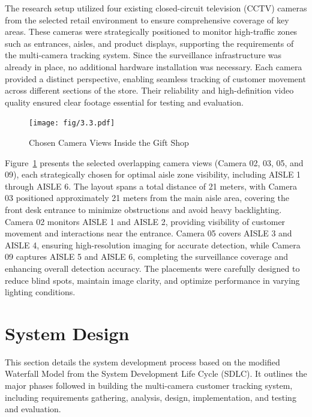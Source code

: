 {The research setup utilized four existing closed-circuit television (CCTV) cameras from the selected retail environment to ensure comprehensive coverage of key areas. These cameras were strategically positioned to monitor high-traffic zones such as entrances, aisles, and product displays, supporting the requirements of the multi-camera tracking system. Since the surveillance infrastructure was already in place, no additional hardware installation was necessary. Each camera provided a distinct perspective, enabling seamless tracking of customer movement across different sections of the store. Their reliability and high-definition video quality ensured clear footage essential for testing and evaluation.

\begin{figure}[H]
	\caption[Chosen Camera Views Inside the Gift Shop]{\newline \newline Chosen Camera Views Inside the Gift Shop}
	\centering
	\texttt{[image: fig/3.3.pdf]}
	\label{fig:3.3}
\end{figure}

Figure~\ref{fig:3.3} presents the selected overlapping camera views (Camera 02, 03, 05, and 09), each strategically chosen for optimal aisle zone visibility, including AISLE 1 through AISLE 6. The layout spans a total distance of 21 meters, with Camera 03 positioned approximately 21 meters from the main aisle area, covering the front desk entrance to minimize obstructions and avoid heavy backlighting. Camera 02 monitors AISLE 1 and AISLE 2, providing visibility of customer movement and interactions near the entrance. Camera 05 covers AISLE 3 and AISLE 4, ensuring high-resolution imaging for accurate detection, while Camera 09 captures AISLE 5 and AISLE 6, completing the surveillance coverage and enhancing overall detection accuracy. The placements were carefully designed to reduce blind spots, maintain image clarity, and optimize performance in varying lighting conditions.

\section{System Design}

This section details the system development process based on the modified Waterfall Model from the System Development Life Cycle (SDLC). It outlines the major phases followed in building the multi-camera customer tracking system, including requirements gathering, analysis, design, implementation, and testing and evaluation.

}
